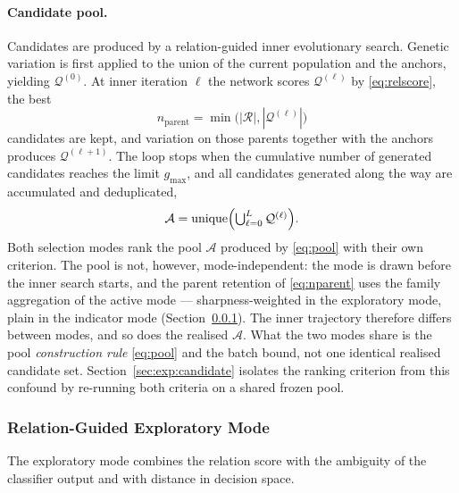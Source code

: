 \documentclass[11pt,a4paper]{article}
\begin{document}
\paragraph{Candidate pool.}
Candidates are produced by a relation-guided inner evolutionary search. Genetic
variation is first applied to the union of the current population and the
anchors, yielding $\mathcal{Q}^{(0)}$. At inner iteration $\ell$ the network
scores $\mathcal{Q}^{(\ell)}$ by \eqref{eq:relscore}, the best
\begin{equation}
n_{\mathrm{parent}}=\min\bigl(|\mathcal{R}|,|\mathcal{Q}^{(\ell)}|\bigr)
\label{eq:nparent}
\end{equation}
candidates are kept, and variation on those parents together with the anchors
produces $\mathcal{Q}^{(\ell+1)}$. The loop stops when the cumulative number of
generated candidates reaches the limit $g_{\max}$, and all candidates generated
along the way are accumulated and deduplicated,
\begin{equation}
\mathcal{A}=\operatorname{unique}
\Bigl(\textstyle\bigcup_{\ell=0}^{L}\mathcal{Q}^{(\ell)}\Bigr).
\label{eq:pool}
\end{equation}
Both selection modes rank the pool $\mathcal{A}$ produced by \eqref{eq:pool} with
their own criterion. The pool is not, however, mode-independent: the mode is drawn
before the inner search starts, and the parent retention of \eqref{eq:nparent} uses
the family aggregation of the active mode --- sharpness-weighted in the exploratory
mode, plain in the indicator mode (Section~\ref{sec:method:candidate:exp}). The
inner trajectory therefore differs between modes, and so does the realised
$\mathcal{A}$. What the two modes share is the pool \emph{construction rule}
\eqref{eq:pool} and the batch bound, not one identical realised candidate set.
Section~\ref{sec:exp:candidate} isolates the ranking criterion from this
confound by re-running both criteria on a shared frozen pool.

\subsubsection{Relation-Guided Exploratory Mode}
\label{sec:method:candidate:exp}

The exploratory mode combines the relation score with the ambiguity of the
classifier output and with distance in decision space.
\end{document}
